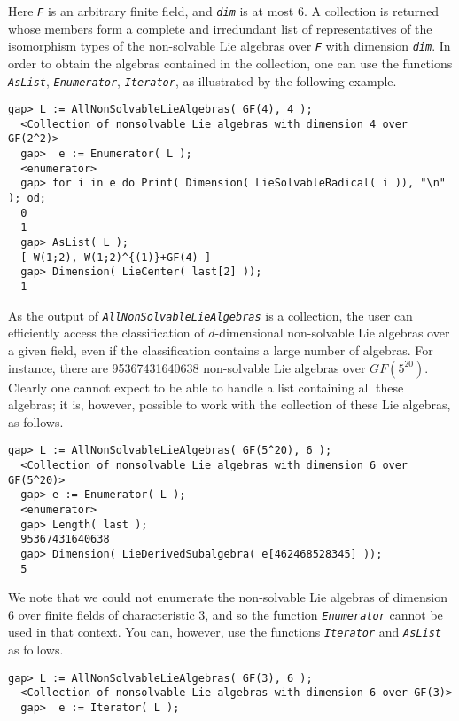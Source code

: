 \documentclass[a4paper,11pt]{report}
\begin{document}
{{{ Here \mbox{\texttt{\slshape F}} is an arbitrary finite field, and \mbox{\texttt{\slshape dim}} is at most 6. A collection is returned whose members form a complete and
irredundant list of representatives of the isomorphism types of the
non-solvable Lie algebras over \mbox{\texttt{\slshape F}} with dimension \mbox{\texttt{\slshape dim}}. In order to obtain the algebras contained in the collection, one can use the
functions \mbox{\texttt{\slshape AsList}}, \mbox{\texttt{\slshape Enumerator}}, \mbox{\texttt{\slshape Iterator}}, as illustrated by the following example. 
\begin{Verbatim}[fontsize=\small,frame=single,label=Example]
  gap> L := AllNonSolvableLieAlgebras( GF(4), 4 );
  <Collection of nonsolvable Lie algebras with dimension 4 over GF(2^2)>
  gap>  e := Enumerator( L );
  <enumerator>
  gap> for i in e do Print( Dimension( LieSolvableRadical( i )), "\n" ); od;
  0
  1
  gap> AsList( L );
  [ W(1;2), W(1;2)^{(1)}+GF(4) ]
  gap> Dimension( LieCenter( last[2] ));
  1
\end{Verbatim}
 As the output of \mbox{\texttt{\slshape AllNonSolvableLieAlgebras}} is a collection, the user can efficiently access the classification of $d$-dimensional non-solvable Lie algebras over a given field, even if the
classification contains a large number of algebras. For instance, there are
95367431640638 non-solvable Lie algebras over $GF(5^{20})$. Clearly one cannot expect to be able to handle a list containing all these
algebras; it is, however, possible to work with the collection of these Lie
algebras, as follows. 
\begin{Verbatim}[fontsize=\small,frame=single,label=Example]
  gap> L := AllNonSolvableLieAlgebras( GF(5^20), 6 );
  <Collection of nonsolvable Lie algebras with dimension 6 over GF(5^20)>
  gap> e := Enumerator( L );
  <enumerator>
  gap> Length( last );
  95367431640638
  gap> Dimension( LieDerivedSubalgebra( e[462468528345] ));
  5
\end{Verbatim}
 We note that we could not enumerate the non-solvable Lie algebras of dimension
6 over finite fields of characteristic 3, and so the function \mbox{\texttt{\slshape Enumerator}} cannot be used in that context. You can, however, use the functions \mbox{\texttt{\slshape Iterator}} and \mbox{\texttt{\slshape AsList}} as follows. 
\begin{Verbatim}[fontsize=\small,frame=single,label=Example]
  gap> L := AllNonSolvableLieAlgebras( GF(3), 6 );
  <Collection of nonsolvable Lie algebras with dimension 6 over GF(3)>
  gap>  e := Iterator( L );

\end{Verbatim}}}}
\end{document}
